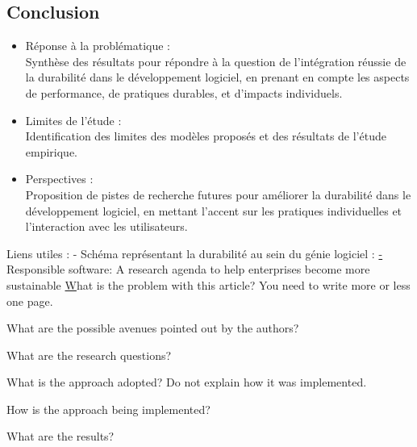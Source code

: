 \subsection{Conclusion}
\begin{itemize}
    \item Réponse à la problématique : \\
    Synthèse des résultats pour répondre à la question de l'intégration réussie de la durabilité dans le développement logiciel, en prenant en compte les aspects de performance, de pratiques durables, et d'impacts individuels.
    \item Limites de l'étude : \\
    Identification des limites des modèles proposés et des résultats de l'étude empirique.
    \item Perspectives : \\
    Proposition de pistes de recherche futures pour améliorer la durabilité dans le développement logiciel, en mettant l'accent sur les pratiques individuelles et l'interaction avec les utilisateurs.
\end{itemize}

Liens utiles :
- Schéma représentant la durabilité au sein du génie logiciel : \href{https://luiscruz.github.io/course_sustainableSE/2022/}

- Responsible software: A research agenda to help enterprises become more sustainable
\href{https://dspace.library.uu.nl/handle/1874/347113}

What is the problem with this article? You need to write more or less one page.

What are the possible avenues pointed out by the authors?

What are the research questions?

What is the approach adopted? Do not explain how it was implemented.

How is the approach being implemented?

What are the results?